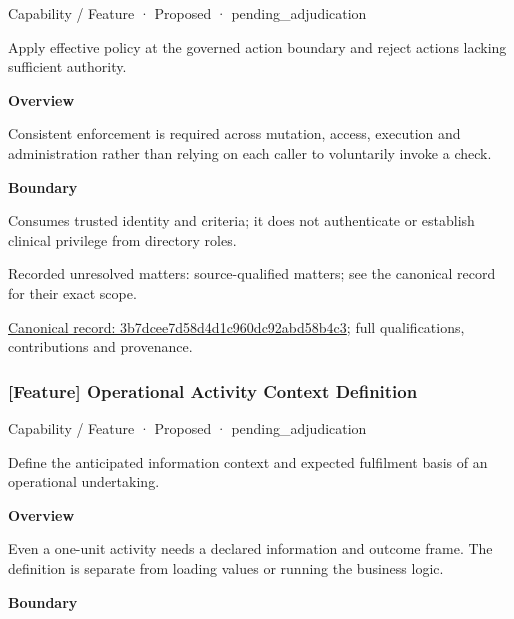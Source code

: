 \label{element:3b7dcee7d58d4d1c960dc92abd58b4c3}
{\small Capability / Feature · Proposed · pending\_adjudication}\par

Apply effective policy at the governed action boundary and reject actions lacking sufficient authority.



\textbf{Overview}



Consistent enforcement is required across mutation, access, execution and administration rather than relying on each caller to voluntarily invoke a check.



\textbf{Boundary}



Consumes trusted identity and criteria; it does not authenticate or establish clinical privilege from directory roles.


{\small Recorded unresolved matters: source-qualified matters; see the canonical record for their exact scope.}\par
{\footnotesize \href{../../../../continuum/strategy/capability/feature/3b7dcee7d58d4d1c960dc92abd58b4c3.md}{Canonical record: 3b7dcee7d58d4d1c960dc92abd58b4c3}; full qualifications, contributions and provenance.}\par
\subsubsection{[Feature] Operational Activity Context Definition}

\label{element:58dcd59389664b7d83d14b536d7d03d0}
{\small Capability / Feature · Proposed · pending\_adjudication}\par

Define the anticipated information context and expected fulfilment basis of an operational undertaking.



\textbf{Overview}



Even a one-unit activity needs a declared information and outcome frame. The definition is separate from loading values or running the business logic.



\textbf{Boundary}



